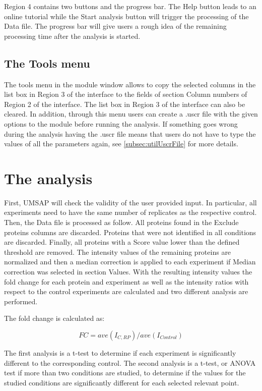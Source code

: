 Region \num{4} contains two buttons and the progress bar. The Help button leads to an online tutorial while the Start analysis button will trigger the processing of the Data file. The progress bar will give users a rough idea of the remaining processing time after the analysis is started.

\subsection{The Tools menu}

The tools menu in the module window allows to copy the selected columns in the list box in Region \num{3} of the interface to the fields of section Column numbers of Region \num{2} of the interface. The list box in Region \num{3} of the interface can also be cleared. In addition, through this menu users can create a .uscr file with the given options to the module before running the analysis. If something goes wrong during the analysis having the .uscr file means that users do not have to type the values of all the parameters again, see \autoref{subsec:utilUscrFile} for more details.   

\section{The analysis}
\label{sec:protprofTTest}

First, UMSAP will check the validity of the user provided input. In particular, all experiments need to have the same number of replicates as the respective control. Then, the Data file is processed as follow. All proteins found in the Exclude proteins columns are discarded. Proteins that were not identified in all conditions are discarded. Finally, all proteins with a Score value lower than the defined threshold are removed. The intensity values of the remaining proteins are normalized and then a median correction is applied to each experiment if Median correction was selected in section Values. With the resulting intensity values the fold change for each protein and experiment as well as the intensity ratios with respect to the control experiments are calculated and two different analysis are performed.

The fold change is calculated as: 

\begin{equation}
\label{eq:protprofFC}
FC = ave(I_{C, RP}) / ave(I_{Control})
\end{equation}

The first analysis is a t-test to determine if each experiment is significantly different to the corresponding control. The second analysis is a t-test, or ANOVA test if more than two conditions are studied, to determine if the values for the studied conditions are significantly different for each selected relevant point.

